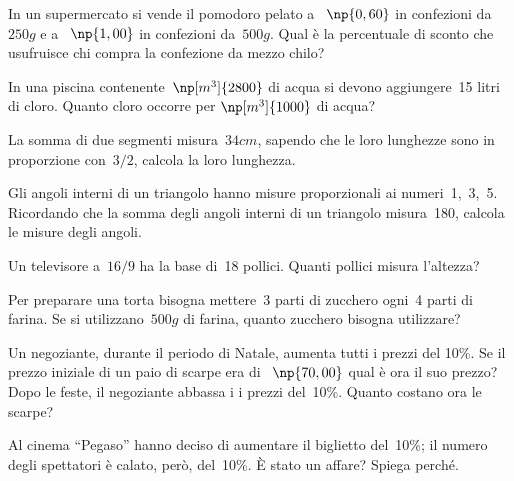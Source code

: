 \begin{multicols}{2}
\begin{esercizio}%
In un supermercato si vende il pomodoro pelato a \officialeuro~$\np{0,60}$ in
confezioni da~$250\unit{g}$ e a \officialeuro~$\np{1,00}$ in confezioni da~$500\unit{g}$. Qual è la
percentuale di sconto che usufruisce chi compra la confezione da mezzo
chilo?
\end{esercizio}

\begin{esercizio}[\Ast]%
In una piscina contenente~$\np[m^3]{2800}$ di acqua si devono
aggiungere~15 litri di cloro. Quanto cloro occorre per
$\np[m^3]{1000}$ di acqua?
\end{esercizio}

\begin{esercizio}[\Ast]%
La somma di due segmenti misura~$34\unit{cm}$, sapendo che le loro lunghezze
sono in proporzione con~$3/2$, calcola la loro lunghezza.
\end{esercizio}

\begin{esercizio}[\Ast]%
Gli angoli interni di un triangolo hanno misure proporzionali ai
numeri~1,~3,~5. Ricordando che la somma degli angoli interni di un
triangolo misura~180\textdegree{}, calcola le misure degli angoli.
\end{esercizio}

\begin{esercizio}%
Un televisore a~$16/9$ ha la base di~18 pollici. Quanti
pollici misura l'altezza?
\end{esercizio}

\begin{esercizio}%
Per preparare una torta bisogna mettere~3 parti di zucchero ogni~4
parti di farina. Se si utilizzano~$500\unit{g}$ di farina, quanto zucchero
bisogna utilizzare?
\end{esercizio}

\begin{esercizio}[\Ast]%
Un negoziante, durante il periodo di Natale, aumenta tutti i prezzi del
10\%. Se il prezzo iniziale di un paio di scarpe era di \officialeuro~$\np{70,00}$
qual è ora il suo prezzo? Dopo le feste, il negoziante abbassa i
i prezzi del~10\%. Quanto costano ora le
scarpe?
\end{esercizio}

\begin{esercizio}[\Ast]%
Al cinema ``Pegaso'' hanno deciso di aumentare il biglietto del~10\%; il numero degli spettatori
è calato, però, del~10\%. È stato un affare? Spiega perché.
\end{esercizio}


\end{multicols}
